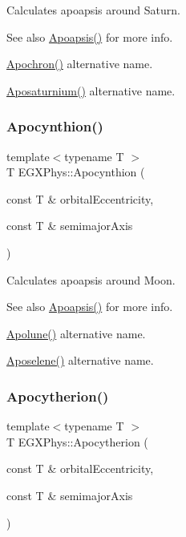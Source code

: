 Calculates apoapsis around Saturn. 

\begin{DoxySeeAlso}{See also}
\hyperlink{group___e_g_x_phys-_apoapsis_gaf962e650bf84a568458e8eb39b1c61ba}{Apoapsis()} for more info. 

\hyperlink{group___e_g_x_phys-_apoapsis_gae4ea146039e6f32022321f0998e715e8}{Apochron()} alternative name. 

\hyperlink{group___e_g_x_phys-_apoapsis_gac157adc20a88c8616e4822eb819f9016}{Aposaturnium()} alternative name. 
\end{DoxySeeAlso}
\mbox{\label{group___e_g_x_phys-_apoapsis_ga557bb4d1a0ce7f17aaa8f8de469d4f52}} 
\subsubsection{\texorpdfstring{Apocynthion()}{Apocynthion()}}
{\footnotesize\ttfamily template$<$typename T $>$ \\
T E\+G\+X\+Phys\+::\+Apocynthion (\begin{DoxyParamCaption}\item[{const T \&}]{orbital\+Eccentricity,  }\item[{const T \&}]{semimajor\+Axis }\end{DoxyParamCaption})}



Calculates apoapsis around Moon. 

\begin{DoxySeeAlso}{See also}
\hyperlink{group___e_g_x_phys-_apoapsis_gaf962e650bf84a568458e8eb39b1c61ba}{Apoapsis()} for more info. 

\hyperlink{group___e_g_x_phys-_apoapsis_gacc68b49812c38394611e1ef3a8bf0e3e}{Apolune()} alternative name. 

\hyperlink{group___e_g_x_phys-_apoapsis_gab61f3b2d6a5be3f62f5fb6dfdf802014}{Aposelene()} alternative name. 
\end{DoxySeeAlso}
\mbox{\label{group___e_g_x_phys-_apoapsis_ga59a284bb0bc11848c5b9ef1283033425}} 
\subsubsection{\texorpdfstring{Apocytherion()}{Apocytherion()}}
{\footnotesize\ttfamily template$<$typename T $>$ \\
T E\+G\+X\+Phys\+::\+Apocytherion (\begin{DoxyParamCaption}\item[{const T \&}]{orbital\+Eccentricity,  }\item[{const T \&}]{semimajor\+Axis }\end{DoxyParamCaption})}



